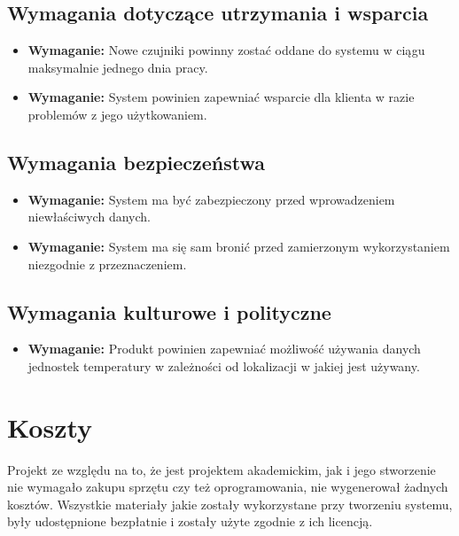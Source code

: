 \documentclass{article}
\begin{document}
\subsection{Wymagania dotyczące utrzymania i wsparcia}
\begin{itemize}
\item \textbf{Wymaganie:} Nowe czujniki powinny zostać oddane do systemu w ciągu maksymalnie jednego dnia pracy.\\
\end{itemize}
\begin{itemize}
\item \textbf{Wymaganie:} System powinien zapewniać wsparcie dla klienta w razie problemów z jego użytkowaniem.\\
\end{itemize}

\subsection{Wymagania bezpieczeństwa}
\begin{itemize}
\item \textbf{Wymaganie:} System ma być zabezpieczony przed wprowadzeniem niewłaściwych danych.\\
\end{itemize}
\begin{itemize}
\item \textbf{Wymaganie:} System ma się sam bronić przed zamierzonym wykorzystaniem niezgodnie z przeznaczeniem.\\
\end{itemize}

\subsection{Wymagania kulturowe i polityczne}
\begin{itemize}
\item \textbf{Wymaganie:} Produkt powinien zapewniać możliwość używania danych jednostek temperatury w zależności od lokalizacji w jakiej jest używany.\\
\end{itemize}

\section{Koszty}
Projekt ze względu na to, że jest projektem akademickim, jak i jego stworzenie nie wymagało zakupu sprzętu czy też oprogramowania, nie wygenerował żadnych kosztów. Wszystkie materiały jakie zostały wykorzystane przy tworzeniu systemu, były udostępnione bezpłatnie i zostały użyte zgodnie z ich licencją.
\end{document}
